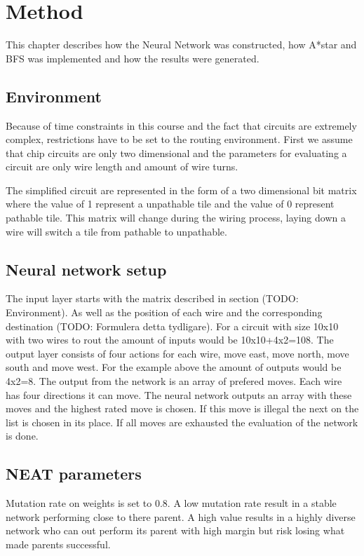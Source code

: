 \documentclass{kththesis}
\begin{document}
\chapter{Method}
This chapter describes how the Neural Network was constructed, how A*star and BFS was implemented and how the results were generated.
\section{Environment}
\label{sec:Environment}
Because of time constraints in this course and the fact that circuits are extremely complex, restrictions have to be set to the routing environment. First we assume that chip circuits are only two dimensional and the parameters for evaluating a circuit are only wire length and amount of wire turns.

The simplified circuit are represented in the form of a two dimensional bit matrix where the value of 1 represent a unpathable tile and the value of 0 represent pathable tile. This matrix will change during the wiring process, laying down a wire will switch a tile from pathable to unpathable. 

\section{Neural network setup}
The input layer starts with the matrix described in section (TODO: Environment). As well as the position of each wire and the corresponding destination (TODO: Formulera detta tydligare). For a circuit with size 10x10 with two wires to rout the amount of inputs would be 10x10+4x2=108. The output layer consists of four actions for each wire, move east, move north, move south and move west. For the example above the amount of outputs would be 4x2=8.
The output from the network is an array of prefered moves. Each wire has four directions it can move. The neural network outputs an array with these moves and the highest rated move is chosen. If this move is illegal the next on the list is chosen in its place. If all moves are exhausted the evaluation of the network is done.

\section{NEAT parameters}
Mutation rate on weights is set to 0.8. A low mutation rate result in a stable network performing close to there parent. A high value results in a highly diverse network who can out perform its parent with high margin but risk losing what made parents successful.
\end{document}
